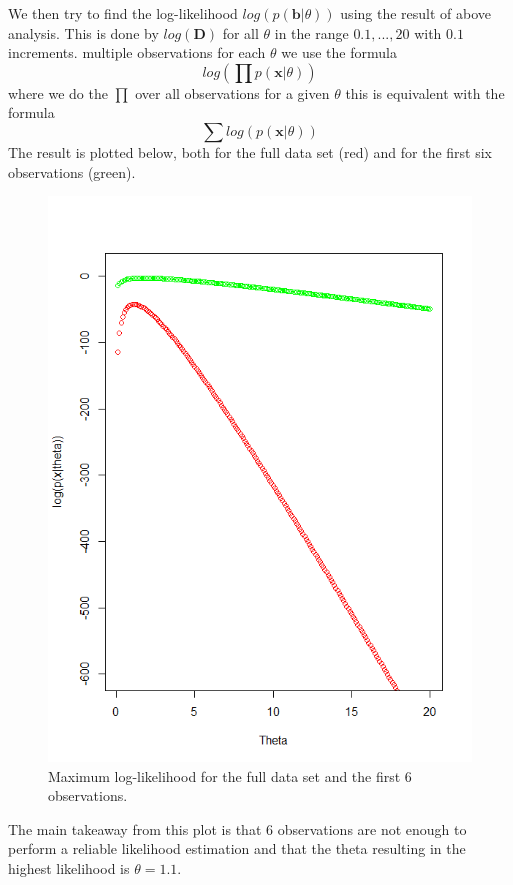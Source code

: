 \documentclass[a4paper,12pt]{article}
\begin{document}
We then try to find the log-likelihood \(log(p(\textbf{b} | \theta))\) using the result of above analysis. This is done by \( log( \mathbf{D} )\) for all \(\theta\) in the range \(0.1,...,20\) with \(0.1\) increments. multiple observations for each \( \theta \) we use the formula 
\begin{equation}
  log( \prod p(\mathbf{x} |\theta))
\end{equation}
where we do the \( \prod \) over all observations for a given \(\theta\) this is equivalent with the formula
\begin{equation}
  \sum{log(p(\mathbf{x} |\theta))}
\end{equation}
The result is plotted below, both for the full data set (red) and for the first six observations (green).
\begin{figure}[H]
\centering
\begin{minipage}[]{0.5\textwidth}
  \includegraphics[width=\textwidth]{figures/Lab1_A2_ll_and_ll6.png}  
  \caption{Maximum log-likelihood for the full data set and the first 6 observations.\label{fig:Maximum log-likelihood for the full data set and the first 6 observations} }
 \end{minipage}
\end{figure}
The main takeaway from this plot is that 6 observations are not enough to perform a reliable likelihood estimation and that the theta resulting in the highest likelihood is \(\theta = 1.1\).
\end{document}

